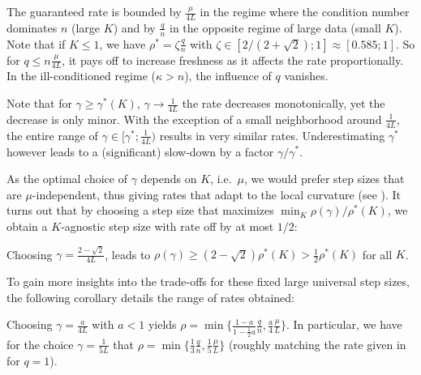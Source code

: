 The guaranteed rate is bounded by $\frac{\mu}{4L}$ in the regime where the condition number dominates $n$  (large $K$)  and by $\frac qn$ in the opposite regime of large data (small $K$). Note that if $K \le 1$, we have $\rho^* = \zeta  \frac qn$ with  $\zeta \in [2/(2 + \sqrt{2}); 1]  \approx [0.585;1]$. So for $q \le n \frac{\mu}{4L}$, it pays off to increase freshness as it affects the rate proportionally.  In the ill-conditioned regime ($\kappa > n$), the influence of $q$ vanishes. 

Note that for $\gamma \ge \gamma^*(K)$, $ \gamma \to \frac1{4L}$ the rate decreases monotonically, yet the decrease is only minor. With the exception of a small neighborhood around $\frac{1}{4L}$, the entire range of $\gamma \in [\gamma^*; \frac{1}{4L})$ results in very similar rates. Underestimating $\gamma^*$  however leads to a (significant) slow-down by a factor $\gamma/\gamma^*$.

As the optimal choice of $\gamma$ depends on $K$, i.e.~$\mu$, we would prefer step sizes that are $\mu$-independent, thus giving rates that adapt to the local curvature  (see \cite{schmidt2013minimizing}). It turns out that by choosing a step size that maximizes $\min_K \rho(\gamma)/\rho^*(K)$, we obtain a $K$-agnostic step size with rate off by at most $1/2$:
\begin{corollary}
\label{corollary:universal}
Choosing $\gamma = \frac{2 -\sqrt{2} }{4L}$, leads to $\rho(\gamma) \ge (2 - \sqrt{2}) \rho^*(K) > \frac 12 \rho^*(K)$ for all $K$.
\end{corollary}
To gain more insights into the trade-offs for these fixed large universal step sizes, the following corollary details the range of rates obtained:
\begin{corollary}
Choosing $\gamma = \frac{a}{4L}$ with $ a<1$ yields $\rho = \min\{ \frac {1-a}{1 - \frac 12 a} \frac qn, \frac{a}{4} \frac \mu L \}$. In particular, we have for the choice $\gamma = \frac{1}{5L}$ that $\rho = \min\{ \frac {1}{3} \frac qn, \frac 15 \frac \mu L \}$ (roughly matching the rate given in~\cite{defazio2014} for $q=1$).
\label{corollary:universal2}
%
%
%
\end{corollary}



